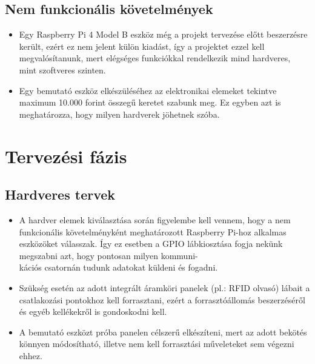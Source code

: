 \documentclass[11pt, a4paper]{article}
\begin{document}
		\subsection{Nem funkcionális követelmények}
			\begin{itemize}
				\justifying
				\item Egy Raspberry Pi 4 Model B eszköz még a projekt tervezése előtt beszerzésre került, ezért ez nem jelent külön kiadást, így a projektet ezzel kell megvalósítanunk, mert elégséges funkciókkal rendelkezik mind hardveres, mint szoftveres szinten.
				
				\item Egy bemutató eszköz elkészüléséhez az elektronikai elemeket tekintve maximum 10.000 forint összegű keretet szabunk meg. Ez egyben azt is meghatározza, hogy milyen hardverek jöhetnek szóba.
			\end{itemize}
	\section{Tervezési fázis}
		\subsection{Hardveres tervek}
			\begin{itemize}
				\justifying
				
				\item A hardver elemek kiválasztása során figyelembe kell vennem, hogy a nem funkcionális követelményként meghatározott Raspberry Pi-hoz alkalmas eszközöket válasszak. Így ez esetben a GPIO lábkiosztása fogja nekünk megszabni azt, hogy pontosan milyen kommuni-\\kációs csatornán tudunk adatokat küldeni és fogadni. 
				
				\item Szükség esetén az adott integrált áramköri panelek (pl.: RFID olvasó) lábait a csatlakozási pontokhoz kell forrasztani, ezért a forrasztóállomás beszerzéséről és egyéb kellékekről is gondoskodni kell.
				
				\item A bemutató eszközt próba panelen célszerű elkészíteni, mert az adott bekötés könnyen módosítható, illetve nem kell forrasztási műveleteket sem végezni ehhez.
			\end{itemize}
\end{document}
